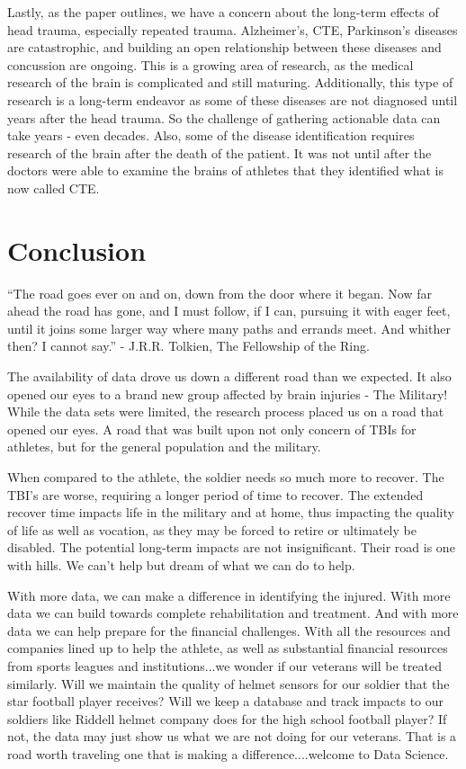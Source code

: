 \documentclass[sigconf]{acmart}
\begin{document}
Lastly, as the paper outlines, we have a concern about the long-term effects of head trauma, especially repeated trauma.  Alzheimer's, CTE, Parkinson's diseases are catastrophic, and building an open relationship between these diseases and concussion are ongoing.  This is a growing area of research, as the medical research of the brain is complicated and still maturing.  Additionally, this type of research is a long-term endeavor as some of these diseases are not diagnosed until years after the head trauma.  So the challenge of gathering actionable data can take years - even decades.  Also, some of the disease identification requires research of the brain after the death of the patient.  It was not until after the doctors were able to examine the brains of athletes that they identified what is now called CTE.


\section{Conclusion}

``The road goes ever on and on, down from the door where it began.  Now far ahead the road has gone, and I must follow, if I can, pursuing it with eager feet, until it joins some larger way where many paths and errands meet.  And whither then?  I cannot say.'' - J.R.R. Tolkien, The Fellowship of the Ring.

The availability of data drove us down a different road than we expected.  It also opened our eyes to a brand new group affected by brain injuries - The Military!  While the data sets were limited, the research process placed us on a road that opened our eyes.  A road that was built upon not only concern of TBIs for athletes, but for the general population and the military.  

When compared to the athlete, the soldier needs so much more to recover.  The TBI's are worse, requiring a longer period of time to recover.  The extended recover time impacts life in the military and at home, thus impacting the quality of life as well as vocation, as they may be forced to retire or ultimately be disabled.  The potential long-term impacts are not insignificant.  Their road is one with hills.  We can't help but dream of what we can do to help.

With more data, we can make a difference in identifying the injured.  With more data we can build towards complete rehabilitation and treatment.  And with more data we can help prepare for the financial challenges.  With all the resources and companies lined up to help the athlete, as well as substantial financial resources from sports leagues and institutions...we wonder if our veterans will be treated similarly.  Will we maintain the quality of helmet sensors for our soldier that the star football player receives?  Will we keep a database and track impacts to our soldiers like Riddell helmet company does for the high school football player?  If not, the data may just show us what we are not doing for our veterans.  That is a road worth traveling one that is making a difference....welcome to Data Science. 
\end{document}

